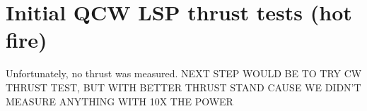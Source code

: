    \section{Initial QCW LSP thrust tests (hot fire)}
 
            
        Unfortunately, no thrust was measured. NEXT STEP WOULD BE TO TRY CW THRUST TEST, BUT WITH BETTER THRUST STAND CAUSE WE DIDN'T MEASURE ANYTHING WITH 10X THE POWER
            

        



